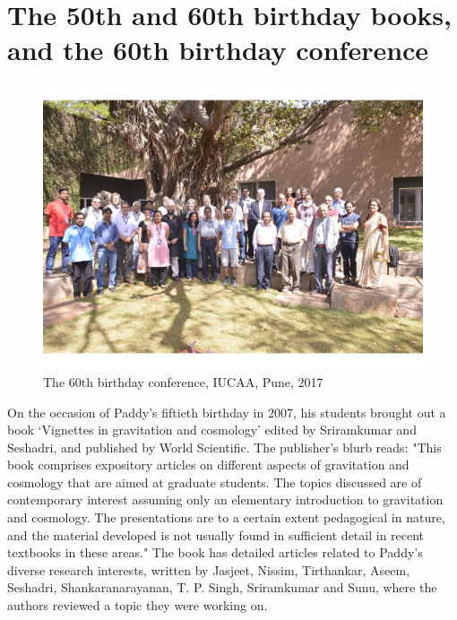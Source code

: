 \documentclass[prd, preprint, longbibliography, 12pt]{revtex4-2}
\begin{document}
\section{The 50th and 60th birthday books, and the 60th birthday conference} 
\begin{figure}[!h]
\centering
\includegraphics[width=12.00cm]{p60.jpeg}
\caption*{The 60th birthday conference, IUCAA, Pune, 2017} 
\end{figure}
On the occasion of Paddy's fiftieth birthday in 2007, his students brought out a book `Vignettes in gravitation and cosmology' edited by Sriramkumar and Seshadri, and published by World Scientific. The publisher's blurb reads: 
"This book comprises expository articles on different aspects of gravitation and cosmology that are aimed at graduate students. The topics discussed are of contemporary interest assuming only an elementary introduction to gravitation and cosmology. The presentations are to a certain extent pedagogical in nature, and the material developed is not usually found in sufficient detail in recent textbooks in these areas." The book has detailed articles related to Paddy's diverse research interests, written by Jasjeet, Nissim, Tirthankar, Aseem, Seshadri, Shankaranarayanan, T. P. Singh, Sriramkumar and Sunu, where the authors reviewed a topic they were working on.
\end{document}

